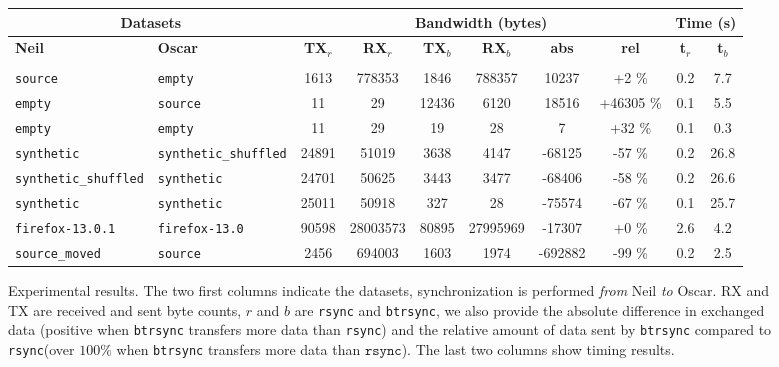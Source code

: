 \documentclass[11pt]{llncs}
\newcommand{\btrsync}{\texttt{btrsync}\xspace}
\newcommand{\rsync}{\texttt{rsync}\xspace}
\begin{document}
\begin{figure}
  \begin{tabularx}{\textwidth}{|X|X||c c|c c|c c|c c|}
    \hline
    \multicolumn{2}{|c||}{\bf Datasets} &
    \multicolumn{6}{c|}{\bf Bandwidth (bytes)} &
    \multicolumn{2}{c|}{\bf Time (s)} \\
    \hline {\bf \hfill Neil \hfill \null} & {\bf \hfill Oscar \hfill \null}
    & {\bf TX$_r$} & {\bf RX$_r$} & {\bf TX$_b$}
    & {\bf RX$_b$} & {\bf abs} & {\bf rel} & {\bf t$_r$} & {\bf t$_b$} \\

    \hline & &&&&&&&&\\[-1em]


\texttt{source} & \texttt{empty} & 1613 & 778353 & 1846 & 788357 & 10237 & +2 \% & 0.2 & 7.7 \\
\texttt{empty} & \texttt{source} & 11 & 29 & 12436 & 6120 & 18516 & +46305 \% & 0.1 & 5.5 \\
\texttt{empty} & \texttt{empty} & 11 & 29 & 19 & 28 & 7 & +32 \% & 0.1 & 0.3 \\
\texttt{synthetic} & \texttt{synthetic\_shuffled} & 24891 & 51019 & 3638 & 4147 & -68125 & -57 \% & 0.2 & 26.8 \\
\texttt{synthetic\_shuffled} & \texttt{synthetic} & 24701 & 50625 & 3443 & 3477 & -68406 & -58 \% & 0.2 & 26.6 \\
\texttt{synthetic} & \texttt{synthetic} & 25011 & 50918 & 327 & 28 & -75574 & -67 \% & 0.1 & 25.7 \\
\texttt{firefox-13.0.1} & \texttt{firefox-13.0} & 90598 & 28003573 & 80895 & 27995969 & -17307 & +0 \% & 2.6 & 4.2 \\
\texttt{source\_moved} & \texttt{source} & 2456 & 694003 & 1603 & 1974 & -692882 & -99 \% & 0.2 & 2.5 \\
\hline

  \end{tabularx}
  \caption{Experimental results. The two first columns indicate the datasets,
    synchronization is performed \emph{from} Neil \emph{to} Oscar. RX and TX are
    received and sent byte counts, $r$ and $b$ are \rsync and \btrsync, we also
    provide the absolute difference in exchanged data (positive when \btrsync
    transfers more data than \rsync) and the relative amount of data sent by
    \btrsync compared to \rsync (over $100\%$ when \btrsync transfers more data
    than $\rsync$). The last two columns show timing results.}
  \label{tab:results}
\end{figure}
\end{document}
